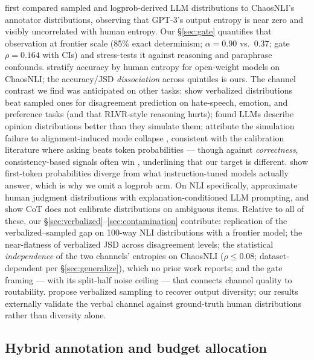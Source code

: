 \documentclass[11pt]{article}
\begin{document}
\citet{lee2023dissenting} first compared sampled and logprob-derived LLM distributions to ChaosNLI's annotator distributions, observing that GPT-3's output entropy is near zero and visibly uncorrelated with human entropy. Our \S\ref{sec:gate} quantifies that observation at frontier scale (85\% exact determinism; $\alpha = 0.90$ vs.\ 0.37; gate $\rho = 0.164$ with CIs) and stress-tests it against reasoning and paraphrase confounds. \citet{madaan2025lost} stratify accuracy by human entropy for open-weight models on ChaosNLI; the accuracy/JSD \emph{dissociation} across quintiles is ours. The channel contrast we find was anticipated on other tasks: \citet{ni2026reasoning} show verbalized distributions beat sampled ones for disagreement prediction on hate-speech, emotion, and preference tasks (and that RLVR-style reasoning hurts); \citet{meister2025benchmarking} found LLMs describe opinion distributions better than they simulate them; \citet{jang2026instruction} attribute the simulation failure to alignment-induced mode collapse \citep[cf.][]{kirk2024understanding}, consistent with the calibration literature where asking beats token probabilities \citep{lin2022teaching,tian2023just,kadavath2022language} --- though against \emph{correctness}, consistency-based signals often win \citep{xiong2024can}, underlining that our target is different. \citet{wang2024myanswer} show first-token probabilities diverge from what instruction-tuned models actually answer, which is why we omit a logprob arm. On NLI specifically, \citet{chen2024seeing,chen2025rose} approximate human judgment distributions with explanation-conditioned LLM prompting, and \citet{chen2026decoupling} show CoT does not calibrate distributions on ambiguous items. Relative to all of these, our \S\ref{sec:verbalized}--\ref{sec:contamination} contribute: replication of the verbalized--sampled gap on 100-way NLI distributions with a frontier model; the near-flatness of verbalized JSD across disagreement levels; the statistical \emph{independence} of the two channels' entropies on ChaosNLI ($\rho \leq 0.08$; dataset-dependent per \S\ref{sec:generalize}), which no prior work reports; and the gate framing --- with its split-half noise ceiling --- that connects channel quality to routability. \citet{zhang2025verbalized} propose verbalized sampling to recover output diversity; our results externally validate the verbal channel against ground-truth human distributions rather than diversity alone.

\subsection{Hybrid annotation and budget allocation}
\label{sec:related-routing}
\end{document}
